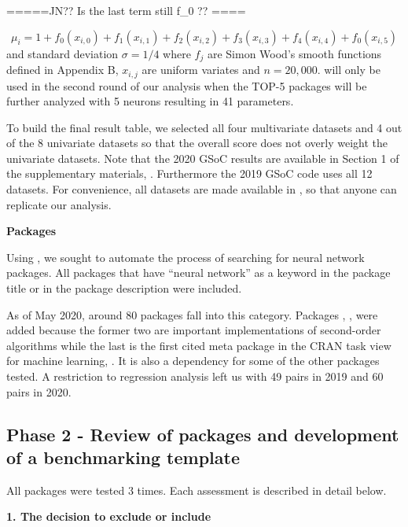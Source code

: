 =====JN?? Is the last term still f\_0 ?? ====

\[
\mu_i = 1+ f_0(x_{i,0})+f_1(x_{i,1})+f_2(x_{i,2})+f_3(x_{i,3})
+f_4(x_{i,4})+f_0(x_{i,5})
\] and standard deviation \(\sigma=1/4\) where \(f_j\) are Simon Wood's
smooth functions defined in Appendix B, \(x_{i,j}\) are uniform variates
and \(n=20,000\).  will only be used in the second round
of our analysis when the TOP-5 packages will be further analyzed with 5
neurons resulting in 41 parameters.

To build the final result table, we selected all four multivariate
datasets and 4 out of the 8 univariate datasets so that the overall
score does not overly weight the univariate datasets. Note that the 2020
GSoC results are available in Section 1 of the supplementary materials,
\citep{suppl:material:paper21}. Furthermore the 2019 GSoC code uses all
12 datasets. For convenience, all datasets are made available in
, so that anyone can replicate our analysis.

\textbf{Packages}

Using  \citep{R-RWsearch}, we sought to automate the
process of searching for neural network packages. All packages that have
``neural network'' as a keyword in the package title or in the package
description were included.

As of May 2020, around 80 packages fall into this category. Packages
, ,  were added because
the former two are important implementations of second-order algorithms
while the last is the first cited meta package in the CRAN task view for
machine learning, . It is also a dependency for
some of the other packages tested. A restriction to regression analysis
left us with 49  pairs in 2019 and 60
 pairs in 2020.

\hypertarget{phase-2---review-of-packages-and-development-of-a-benchmarking-template}{%
\subsection{Phase 2 - Review of packages and development of a
benchmarking
template}\label{phase-2---review-of-packages-and-development-of-a-benchmarking-template}}

All packages were tested 3 times. Each assessment is described in detail
below.

\textbf{1. The decision to exclude or include}

